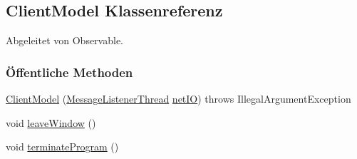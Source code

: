 \hypertarget{a00003}{\subsection{Client\-Model Klassenreferenz}
\label{a00003}
}


Abgeleitet von Observable.

\subsubsection*{Öffentliche Methoden}
\begin{DoxyCompactItemize}
\item 
\hyperlink{a00003_a3ceb1e33662c266c7e69bd7bd4e7f68b}{Client\-Model} (\hyperlink{a00005}{Message\-Listener\-Thread} \hyperlink{a00003_a95e1dc2c60f1fe9bcaaba816079c9854}{net\-I\-O})  throws Illegal\-Argument\-Exception 
\item 
void \hyperlink{a00003_a04485ff586acf6bebed228486d575ec8}{leave\-Window} ()
\item 
\hypertarget{a00003_a0e04049aeb0da8dfc68c3dee2ee24098}{void \hyperlink{a00003_a0e04049aeb0da8dfc68c3dee2ee24098}{terminate\-Program} ()}\label{a00003_a0e04049aeb0da8dfc68c3dee2ee24098}


\end{DoxyCompactItemize}
